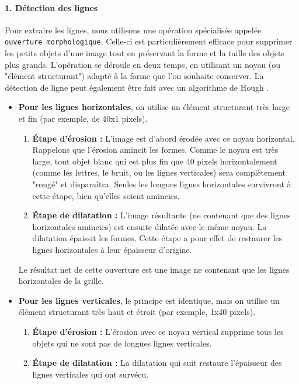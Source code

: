 \documentclass{article}
\begin{document}
\paragraph{1. Détection des lignes}
Pour extraire les lignes, nous utilisons une opération spécialisée appelée \texttt{ouverture morphologique}. Celle-ci est particulièrement efficace pour supprimer les petits objets d'une image tout en préservant la forme et la taille des objets plus grands. L'opération se déroule en deux temps, en utilisant un noyau (ou "élément structurant") adapté à la forme que l'on souhaite conserver. La détection de ligne peut également être fait avec un algorithme de Hough \cite{duda1972use}.

\begin{itemize}
    \item \textbf{Pour les lignes horizontales}, on utilise un élément structurant très large et fin (par exemple, de 40x1 pixels).
    \begin{enumerate}
        \item \textbf{Étape d'érosion :} L'image est d'abord érodée avec ce noyau horizontal. Rappelons que l'érosion amincit les formes. Comme le noyau est très large, tout objet blanc qui est plus fin que 40 pixels horizontalement (comme les lettres, le bruit, ou les lignes verticales) sera complètement "rongé" et disparaîtra. Seules les longues lignes horizontales survivront à cette étape, bien qu'elles soient amincies.
        \item \textbf{Étape de dilatation :} L'image résultante (ne contenant que des lignes horizontales amincies) est ensuite dilatée avec le même noyau. La dilatation épaissit les formes. Cette étape a pour effet de restaurer les lignes horizontales à leur épaisseur d'origine.
    \end{enumerate}
    Le résultat net de cette ouverture est une image ne contenant que les lignes horizontales de la grille.

    \item \textbf{Pour les lignes verticales}, le principe est identique, mais on utilise un élément structurant très haut et étroit (par exemple, 1x40 pixels).
    \begin{enumerate}
        \item \textbf{Étape d'érosion :} L'érosion avec ce noyau vertical supprime tous les objets qui ne sont pas de longues lignes verticales.
        \item \textbf{Étape de dilatation :} La dilatation qui suit restaure l'épaisseur des lignes verticales qui ont survécu.
    \end{enumerate}
\end{itemize}
\end{document}
